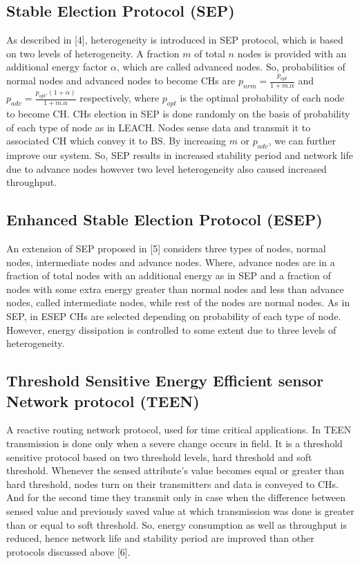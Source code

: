 \documentclass[conference]{IEEEtran}
\begin{document}
\subsection{Stable Election Protocol (SEP)}

As described in [4], heterogeneity is introduced in SEP protocol, which is based on two levels of heterogeneity. A fraction $m$ of total $n$ nodes is provided with an additional energy factor $\alpha$, which are called advanced nodes. So, probabilities of normal nodes and advanced nodes to become CHs are $p_{nrm}=\frac{p_{opt}}{1+m.\alpha}$ and $p_{adv}=\frac{p_{opt}.(1+\alpha)}{1+m.\alpha}$ respectively, where $p_{opt}$ is the optimal probability of each node to become CH. CHs election in SEP is done randomly on the basis of probability of each type of node as in LEACH. Nodes sense data and transmit it to associated CH which convey it to BS. By increasing $m$ or $p_{adv}$, we can further improve our system. So, SEP results in increased stability period and network life due to advance nodes however two level heterogeneity also caused increased throughput.

\subsection{Enhanced Stable Election Protocol (ESEP)}

An extension of SEP proposed in [5] considers three types of nodes, normal nodes, intermediate nodes and advance nodes. Where, advance nodes are in a fraction of total nodes with an additional energy as in SEP and a fraction of nodes with some extra energy greater than normal nodes and less than advance nodes, called intermediate nodes, while rest of the nodes are normal nodes. As in SEP, in ESEP CHs are selected depending on probability of each type of node. However, energy dissipation is controlled to some extent due to three levels of heterogeneity.

\subsection{Threshold Sensitive Energy Efficient sensor Network protocol (TEEN)}

A reactive routing network protocol, used for time critical applications. In TEEN transmission is done only when a severe change occurs in field. It is a threshold sensitive protocol based on two threshold levels, hard threshold and soft threshold. Whenever the sensed attribute's value becomes equal or greater than hard threshold, nodes turn on their transmitters and data is conveyed to CHs. And for the second time they transmit only in case when the difference between sensed value and previously saved value at which transmission was done is greater than or equal to soft threshold. So, energy consumption as well as throughput is reduced, hence network life and stability period are improved than other protocols discussed above [6].\\
\end{document}
